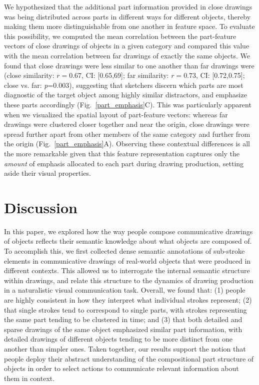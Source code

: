 \documentclass[10pt,letterpaper]{article}
\begin{document}
We hypothesized that the additional part information provided in close drawings was being distributed across parts in different ways for different objects, thereby making them more distinguishable from one another in feature space.
To evaluate this possibility, we computed the mean correlation between the part-feature vectors of close drawings of objects in a given category and compared this value with the mean correlation between far drawings of exactly the same objects. 
We found that close drawings were less similar to one another than far drawings were (close similarity: $r = 0.67$, CI: [0.65,69]; far similarity: $r = 0.73$, CI: [0.72,0.75]; close vs. far: \textit{p}=$0.003$), suggesting that sketchers discern which parts are most diagnostic of the target object among highly similar distractors, and emphasize these parts accordingly (Fig.~\ref{part_emphasis}C).
This was particularly apparent when we visualized the spatial layout of part-feature vectors: whereas far drawings were clustered closer together and near the origin, close drawings were spread further apart from other members of the same category and further from the origin (Fig.~\ref{part_emphasis}A).
Observing these contextual differences is all the more remarkable given that this feature representation captures only the \textit{amount} of emphasis allocated to each part during drawing production, setting aside their visual properties. 

\section{Discussion}

In this paper, we explored how the way people compose communicative drawings of objects reflects their semantic knowledge about what objects are composed of. 
To accomplish this, we first collected dense semantic annotations of sub-stroke elements in communicative drawings of real-world objects that were produced in different contexts. 
This allowed us to interrogate the internal semantic structure within drawings, and relate this structure to the dynamics of drawing production in a naturalistic visual communication task.
Overall, we found that: (1) people are highly consistent in how they interpret what individual strokes represent; (2) that single strokes tend to correspond to single parts, with strokes representing the same part tending to be clustered in time; and (3) that both detailed and sparse drawings of the same object emphasized similar part information, with detailed drawings of different objects tending to be more distinct from one another than simpler ones. 
Taken together, our results support the notion that people deploy their abstract understanding of the compositional part structure of objects in order to select actions to communicate relevant information about them in context.  
\end{document}
